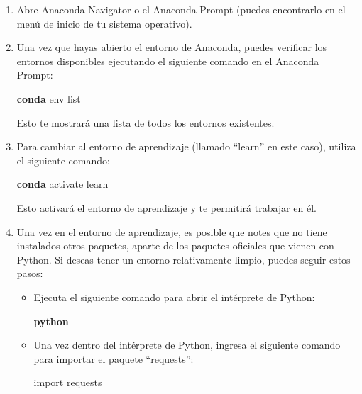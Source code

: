 \documentclass[
  a4paper,
]{article}
\newenvironment{Shaded}{}{}
\newcommand{\ExtensionTok}[1]{\textcolor[rgb]{0.84,0.23,0.29}{\textbf{#1}}}
\newcommand{\ImportTok}[1]{\textcolor[rgb]{0.01,0.18,0.38}{#1}}
\newcommand{\NormalTok}[1]{\textcolor[rgb]{0.14,0.16,0.18}{#1}}
\begin{document}
\begin{enumerate}
\def\labelenumi{\arabic{enumi}.}
\item
  Abre Anaconda Navigator o el Anaconda Prompt (puedes encontrarlo en el
  menú de inicio de tu sistema operativo).
\item
  Una vez que hayas abierto el entorno de Anaconda, puedes verificar los
  entornos disponibles ejecutando el siguiente comando en el Anaconda
  Prompt:

\begin{Shaded}
\begin{Highlighting}[]
\ExtensionTok{conda}\NormalTok{ env list}
\end{Highlighting}
\end{Shaded}

  Esto te mostrará una lista de todos los entornos existentes.
\item
  Para cambiar al entorno de aprendizaje (llamado ``learn'' en este
  caso), utiliza el siguiente comando:

\begin{Shaded}
\begin{Highlighting}[]
\ExtensionTok{conda}\NormalTok{ activate learn}
\end{Highlighting}
\end{Shaded}

  Esto activará el entorno de aprendizaje y te permitirá trabajar en él.
\item
  Una vez en el entorno de aprendizaje, es posible que notes que no
  tiene instalados otros paquetes, aparte de los paquetes oficiales que
  vienen con Python. Si deseas tener un entorno relativamente limpio,
  puedes seguir estos pasos:

  \begin{itemize}
  \item
    Ejecuta el siguiente comando para abrir el intérprete de Python:

\begin{Shaded}
\begin{Highlighting}[]
\ExtensionTok{python}
\end{Highlighting}
\end{Shaded}
  \item
    Una vez dentro del intérprete de Python, ingresa el siguiente
    comando para importar el paquete ``requests'':

\begin{Shaded}
\begin{Highlighting}[]
\ImportTok{import}\NormalTok{ requests}
\end{Highlighting}
\end{Shaded}


\end{itemize}
\end{enumerate}
\end{document}

